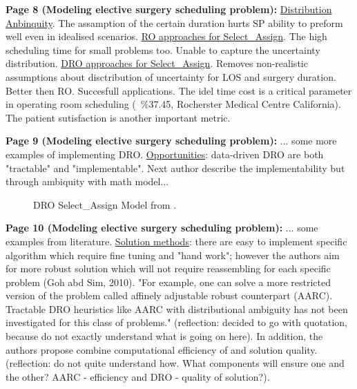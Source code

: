     \textbf{Page 8 (Modeling elective surgery scheduling problem):}
    \underline{Distribution Anbinquity}. The assamption of the certain duration hurts SP ability to preform well even in idealised scenarios. \underline{RO approaches for Select\_Assign}. The high scheduling time for small problems too. Unable to capture the uncertainty distribution. \underline{DRO approaches for Select\_Assign}. Removes non-realistic assumptions about disctribution of uncertainty for LOS and surgery duration. Better then RO. Succesfull applications. The idel time cost is a critical parameter in operating room scheduling (~\%37.45, Rocherster Medical Centre California). The patient sutisfaction is another important metric.

    \textbf{Page 9 (Modeling elective surgery scheduling problem):}
    ... some more examples of implementing DRO. \underline{Opportunities}: data-driven DRO are both "tractable" and "implementable". Next author describe the implementability but through ambiquity with math model...
    \begin{figure}[H]
        \centering
        \caption{DRO Select\_Assign Model from \cite{x335}.}
        \label{fig8:0015_SR04US22}
    \end{figure}

    \textbf{Page 10 (Modeling elective surgery scheduling problem):}
    ... some examples from literature. \underline{Solution methods}: there are easy to implement specific algorithm which require fine tuning and "hand work"; however the authors aim for more robust solution which will not require reassembling for each specific problem (Goh abd Sim, 2010). "For example, one can solve a more restricted version of the problem called affinely adjustable robust counterpart (AARC). Tractable DRO heuristics like AARC with distributional ambiguity has not been investigated for this class of problems." (reflection: decided to go with quotation, because do not exactly understand what is going on here). In addition, the authors propose combine computational efficiency of and solution quality. (reflection: do not quite understand how. What components will ensure one and the other? AARC - efficiency and DRO - quality of solution?). 
    
